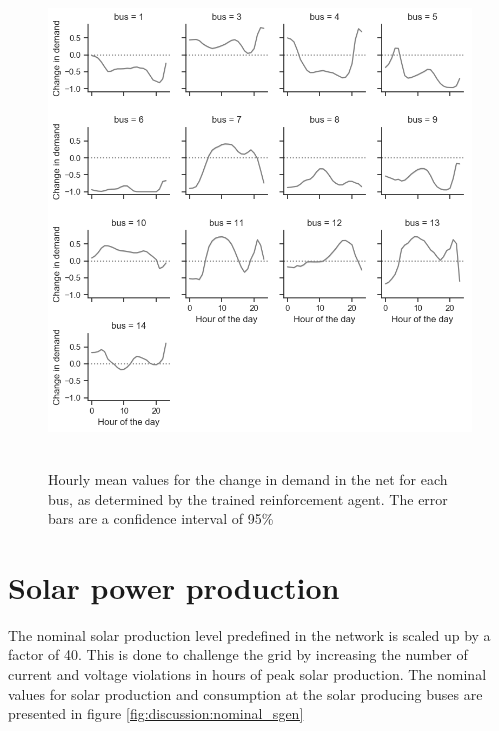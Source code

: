 \documentclass[class=book, crop=false]{standalone}
\begin{document}
\begin{figure}[h]
    \center
\includegraphics[height=13cm, width=12cm]{figures/config1_action_bus.png}
    \caption[size = 9]{Hourly mean values for the change in demand in the net for each bus, as determined by the trained reinforcement agent. The error bars are a confidence interval of 95\%}
    \label{fig:discussion:config1_action_bus}
\end{figure}


\section{Solar power production}
The nominal solar production level predefined in the network is scaled up by a factor of 40. This is done to challenge the grid by increasing the number of current and voltage violations in hours of peak solar production. The nominal values for solar production and consumption at the solar producing buses are presented in figure \ref{fig:discussion:nominal_sgen}
\end{document}
